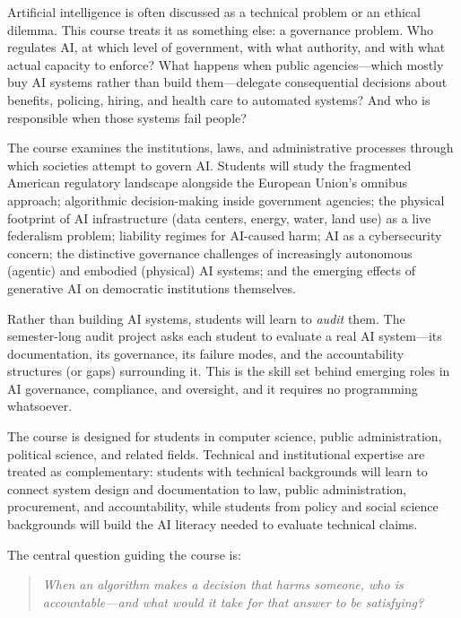 \documentclass[12pt]{article}
\begin{document}
{\setlength{\parindent}{0pt}\setlength{\parskip}{0.6\baselineskip}%
Artificial intelligence is often discussed as a technical problem or an ethical dilemma. This course treats it as something else: a governance problem. Who regulates AI, at which level of government, with what authority, and with what actual capacity to enforce? What happens when public agencies---which mostly buy AI systems rather than build them---delegate consequential decisions about benefits, policing, hiring, and health care to automated systems? And who is responsible when those systems fail people?

The course examines the institutions, laws, and administrative processes through which societies attempt to govern AI. Students will study the fragmented American regulatory landscape alongside the European Union's omnibus approach; algorithmic decision-making inside government agencies; the physical footprint of AI infrastructure (data centers, energy, water, land use) as a live federalism problem; liability regimes for AI-caused harm; AI as a cybersecurity concern; the distinctive governance challenges of increasingly autonomous (agentic) and embodied (physical) AI systems; and the emerging effects of generative AI on democratic institutions themselves.

Rather than building AI systems, students will learn to \emph{audit} them. The semester-long audit project asks each student to evaluate a real AI system---its documentation, its governance, its failure modes, and the accountability structures (or gaps) surrounding it. This is the skill set behind emerging roles in AI governance, compliance, and oversight, and it requires no programming whatsoever.

The course is designed for students in computer science, public administration, political science, and related fields. Technical and institutional expertise are treated as complementary: students with technical backgrounds will learn to connect system design and documentation to law, public administration, procurement, and accountability, while students from policy and social science backgrounds will build the AI literacy needed to evaluate technical claims.

The central question guiding the course is:

\begin{quote}
\textit{When an algorithm makes a decision that harms someone, who is accountable---and what would it take for that answer to be satisfying?}
\end{quote}
}
\end{document}
